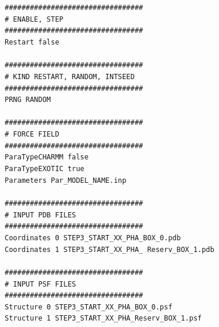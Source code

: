 \texttt{\#\#\#\#\#\#\#\#\#\#\#\#\#\#\#\#\#\#\#\#\#\#\#\#\#\#\#\#\#\#\#\#\#}\\
\texttt{\# ENABLE, STEP}\\
\texttt{\#\#\#\#\#\#\#\#\#\#\#\#\#\#\#\#\#\#\#\#\#\#\#\#\#\#\#\#\#\#\#\#\#}\\
\texttt{Restart	 	false   }\\
\texttt{}\\
\texttt{\#\#\#\#\#\#\#\#\#\#\#\#\#\#\#\#\#\#\#\#\#\#\#\#\#\#\#\#\#\#\#\#\#}\\
\texttt{\# KIND {RESTART, RANDOM, INTSEED}}\\
\texttt{\#\#\#\#\#\#\#\#\#\#\#\#\#\#\#\#\#\#\#\#\#\#\#\#\#\#\#\#\#\#\#\#\#}\\
\texttt{PRNG     		RANDOM}\\
\texttt{}\\
\texttt{\#\#\#\#\#\#\#\#\#\#\#\#\#\#\#\#\#\#\#\#\#\#\#\#\#\#\#\#\#\#\#\#\#}\\
\texttt{\# FORCE FIELD}\\
\texttt{\#\#\#\#\#\#\#\#\#\#\#\#\#\#\#\#\#\#\#\#\#\#\#\#\#\#\#\#\#\#\#\#\#}\\
\texttt{ParaTypeCHARMM	   false}\\
\texttt{ParaTypeEXOTIC	   true}\\
\texttt{Parameters        	   Par\_MODEL\_NAME.inp}\\
\texttt{}\\
\texttt{\#\#\#\#\#\#\#\#\#\#\#\#\#\#\#\#\#\#\#\#\#\#\#\#\#\#\#\#\#\#\#\#\#}\\
\texttt{\# INPUT PDB FILES}\\
\texttt{\#\#\#\#\#\#\#\#\#\#\#\#\#\#\#\#\#\#\#\#\#\#\#\#\#\#\#\#\#\#\#\#\#}\\
\texttt{Coordinates 0    STEP3\_START\_XX\_PHA\_BOX\_0.pdb  }\\
\texttt{Coordinates 1	   STEP3\_START\_XX\_PHA\_ Reserv\_BOX\_1.pdb}\\
\texttt{}\\
\texttt{\#\#\#\#\#\#\#\#\#\#\#\#\#\#\#\#\#\#\#\#\#\#\#\#\#\#\#\#\#\#\#\#\#}\\
\texttt{\# INPUT PSF FILES}\\
\texttt{\#\#\#\#\#\#\#\#\#\#\#\#\#\#\#\#\#\#\#\#\#\#\#\#\#\#\#\#\#\#\#\#\#}\\
\texttt{Structure 0  	 STEP3\_START\_XX\_PHA\_BOX\_0.psf  }\\
\texttt{Structure 1	 STEP3\_START\_XX\_PHA\_Reserv\_BOX\_1.psf}\\
\texttt{}\\
